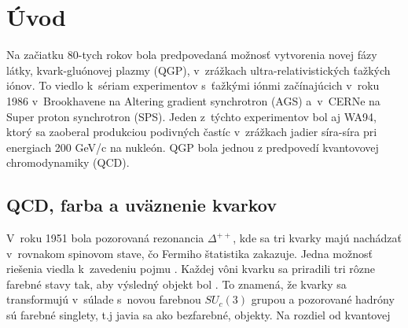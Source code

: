 \chapter{Úvod}
Na začiatku 80-tych rokov bola predpovedaná možnosť
vytvorenia novej fázy látky, kvark-gluónovej plazmy (QGP), v~zrážkach
ultra-relativistických ťažkých iónov. To viedlo k~sériam
experimentov s~ťažkými iónmi začínajúcich v~roku 1986
v~Brookhavene na Altering gradient synchrotron (AGS) a~v~CERNe na Super
proton synchrotron (SPS). Jeden z~týchto experimentov bol aj WA94, ktorý
sa zaoberal produkciou podivných častíc v~zrážkach jadier síra-síra
pri energiach 200 GeV/c na nukleón. QGP bola jednou z
predpovedí kvantovovej chromodynamiky (QCD).

\section{QCD, farba a uväznenie kvarkov}
V~roku 1951 bola pozorovaná rezonancia $\Delta^{++}$, kde sa tri kvarky
majú nachádzať v~rovnakom spinovom stave, čo Fermiho štatistika
zakazuje. Jedna možnosť riešenia viedla
k~zavedeniu pojmu . Každej vôni kvarku sa priradili tri
rôzne farebné stavy tak, aby výsledný objekt bol .
To znamená, že kvarky sa transformujú v~súlade s~novou farebnou
$SU_c(3)$ grupou a pozorované hadróny sú farebné singlety, t.j javia
sa ako bezfarebné,  objekty. Na rozdiel od kvantovej
